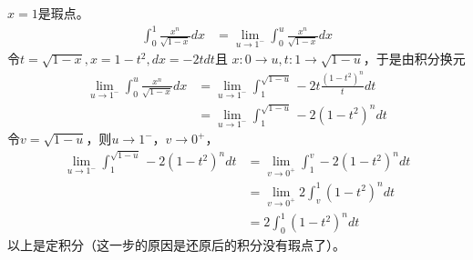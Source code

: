 \documentclass{article}
\begin{document}
\begin{itemize}
        $x = 1$是瑕点。
        \begin{align*}
          \int_{0}^{1} \frac{x^n}{\sqrt{1 - x}} dx
           & = \lim\limits_{u \to 1^-} \int_{0}^{u} \frac{x^n}{\sqrt{1 - x}} dx
        \end{align*}
        令$t = \sqrt{1 - x}, x = 1 - t^2, dx = -2t dt$且
        $x: 0 \to u, t: 1 \to \sqrt{1 - u}$，于是由积分换元
        \begin{align*}
          \lim\limits_{u \to 1^-} \int_{0}^{u} \frac{x^n}{\sqrt{1 - x}} dx
           & = \lim\limits_{u \to 1^-} \int_{1}^{\sqrt{1 - u}} -2 t \frac{(1 - t^2)^n}{t} dt \\
           & = \lim\limits_{u \to 1^-} \int_{1}^{\sqrt{1 - u}} -2 (1 - t^2)^n dt
        \end{align*}
        令$v = \sqrt{1 - u}$，则$u \to 1^-$，$v \to 0^+$，
        \begin{align*}
          \lim\limits_{u \to 1^-} \int_{1}^{\sqrt{1 - u}} -2 (1 - t^2)^n dt
           & = \lim\limits_{v \to 0^+} \int_{1}^{v} -2 (1 - t^2)^n dt \\
           & = \lim\limits_{v \to 0^+} 2 \int_{v}^{1} (1 - t^2)^n dt  \\
           & = 2 \int_{0}^{1} (1 - t^2)^n dt
        \end{align*}
        以上是定积分（这一步的原因是还原后的积分没有瑕点了）。


\end{itemize}
\end{document}
